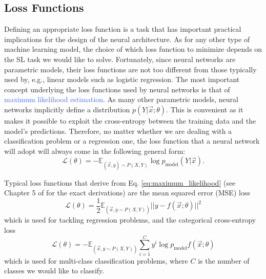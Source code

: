 \subsection{Loss Functions}
\label{sec:loss_functions}
Defining an appropriate loss function is a task that has important practical implications for the design of the neural architecture. As for any other type of machine learning model, the choice of which loss function to minimize depends on the SL task we would like to solve. Fortunately, since neural networks are parametric models, their loss functions are not too different from those typically used by, e.g.,  linear models such as logistic regression. The most important concept underlying the loss functions used by neural networks is that of \textcolor{RoyalBlue}{maximum likelihood estimation}. As many other parametric models, neural networks implicitly define a distribution $p(Y|\vec{x};\theta)$. This is convenient as it makes it possible to exploit the cross-entropy between the training data and the model's predictions. Therefore, no matter whether we are dealing with a classification problem or a regression one, the loss function that a neural network will adopt will always come in the following general form:
\begin{equation}
	\mathscr{L}(\theta) = - \mathds{E}_{(\vec{x},y)\sim P(X,Y)} \log p_\text{model} (Y|\vec{x}).
	\label{eq:maximum_likelihood}
\end{equation}

Typical loss functions that derive from Eq. \ref{eq:maximum_likelihood} (see Chapter 5 of \cite{goodfellow2016deep} for the exact derivations) are the mean squared error (MSE) loss
\begin{equation}
	\mathscr{L}(\theta) = \frac{1}{2}\mathds{E}_{(\vec{x},y\sim P(X,Y))} ||y - f(\vec{x};\theta) ||^{2}
	\label{eq:mean_squared_error}
\end{equation}
which is used for tackling regression problems, and the categorical cross-entropy loss
\begin{equation}
	\mathscr{L}(\theta) = - \mathds{E}_{(\vec{x},y\sim P(X,Y))} \sum_{i=1}^{C} y^{i} \log p_\text{model} f(\vec{x};\theta)
	\label{eq:cross_entropy}
\end{equation}
which is used for multi-class classification problems, where $C$ is the number of classes we would like to classify. 

